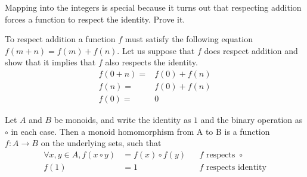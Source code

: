 \begin{ttta}
	Mapping into the integers is special because it turns out that respecting
	addition forces a function to respect the identity. Prove it.
\end{ttta}
\begin{figure}[H]
	\begin{center}
		
	\end{center}
\end{figure}
\begin{proofitem}
	\item To respect addition a function $f$ must satisfy the following equation $f(m+n) =
		f(m)+f(n)$.  Let us suppose that $f$ does respect addition and show that it
	implies that $f$ also respects the identity.
	\begin{align*}
		f(0+n) = & f(0) + f(n) \\
		f(n) =   & f(0) + f(n) \\
		f(0) =   & 0
	\end{align*}
\end{proofitem}

\begin{figure}[H]
	\begin{center}
		
	\end{center}
\end{figure}
\begin{definition}
	Let $A$ and $B$ be monoids, and write the identity as $1$ and the
	binary operation as $\circ$ in each case. Then a monoid homomorphism from A to
	B is a function $f:A\rightarrow B$ on the underlying sets, such that
	\begin{align*}
		\forall x, y \in A, f(x \circ y) & = f(x) \circ f(y) &  & f\text{ respects }\circ    \\
		f(1)                             & =1                &  & f\text{ respects identity}
	\end{align*}
\end{definition}

